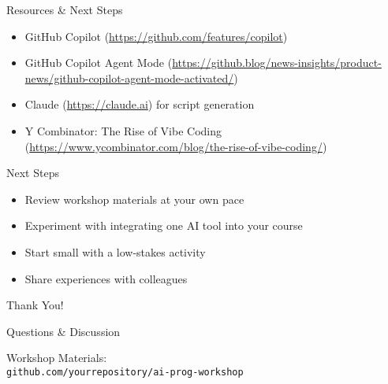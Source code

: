 \documentclass{beamer}
\begin{document}
\begin{frame}{Resources \& Next Steps}
    \begin{tcolorbox}[colback=myblue!5,colframe=myblue,title=AI Tools for Programming Education]
        \begin{itemize}
            \item GitHub Copilot (\url{https://github.com/features/copilot})
            \item GitHub Copilot Agent Mode (\url{https://github.blog/news-insights/product-news/github-copilot-agent-mode-activated/})
            \item Claude (\url{https://claude.ai}) for script generation
            \item Y Combinator: The Rise of Vibe Coding (\url{https://www.ycombinator.com/blog/the-rise-of-vibe-coding/})
        \end{itemize}
    \end{tcolorbox}
    
    \begin{alertblock}{Next Steps}
        \begin{itemize}
            \item Review workshop materials at your own pace
            \item Experiment with integrating one AI tool into your course
            \item Start small with a low-stakes activity
            \item Share experiences with colleagues
        \end{itemize}
    \end{alertblock}
\end{frame}

\begin{frame}{Thank You!}
    \begin{center}
        \huge{Questions \& Discussion}
        
        \vspace{1cm}
        
        \large{Workshop Materials:} \\
        \texttt{github.com/yourrepository/ai-prog-workshop}
    \end{center}
\end{frame}
\end{document}
